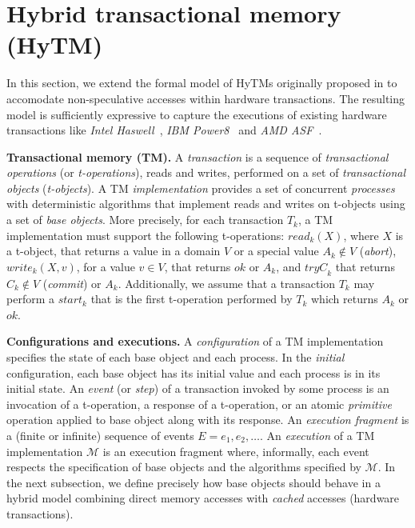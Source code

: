 \section{Hybrid transactional memory (HyTM)}
\label{sec:hytm}
%
In this section, we extend the formal model of HyTMs originally proposed in \cite{htmdisc15} to accomodate non-speculative accesses within hardware transactions.
The resulting model is sufficiently expressive to capture the executions of existing hardware transactions like \emph{Intel Haswell}~\cite{Rei12},
\emph{IBM Power8}~\cite{bluegene} and \emph{AMD ASF}~\cite{asf}.

\vspace{1mm}\noindent\textbf{Transactional memory (TM).} 
A \emph{transaction} is a sequence of \emph{transactional operations}
(or \emph{t-operations}), reads and writes, performed on a set of \emph{transactional objects} 
(\emph{t-objects}). 
A TM \emph{implementation} provides a set of
concurrent \emph{processes} with deterministic algorithms that implement reads and
writes on t-objects using  a set of \emph{base objects}.
More precisely, for each transaction $T_k$, a TM implementation must support the following t-operations: 
$\mathit{read}_k(X)$, where $X$ is a t-object, that returns a value in
a domain $V$
or a special value $A_k\notin V$ (\emph{abort}),
$\mathit{write}_k(X,v)$, for a value $v \in V$,
that returns $\mathit{ok}$ or $A_k$, and
$\mathit{tryC}_k$ that returns $C_k\notin V$ (\emph{commit}) or $A_k$.
Additionally, we assume that a transaction $T_k$
may perform a $\mathit{start_k}$ that is the first t-operation performed by $T_k$ which returns $A_k$ or $\mathit{ok}$.

\vspace{1mm}\noindent\textbf{Configurations and executions.} 
A \emph{configuration} of a TM implementation specifies the state of each base object and each process. 
In the \emph{initial} configuration, each base object has its initial value and each process is in its initial state. 
An \emph{event} (or \emph{step}) of a transaction invoked by some process is an invocation of a t-operation, 
a response of a t-operation, or an atomic \emph{primitive} operation applied to base object along with its response. 
An \emph{execution fragment} is a (finite or infinite) sequence of events $E = e_1,e_2,\dots$. 
An \emph{execution} of a TM implementation $\mathcal{M}$ is an
execution fragment where, informally, each event respects the
specification of base objects and the algorithms specified by $\mathcal{M}$.
In the next subsection, we define precisely how base objects should
behave in a hybrid model combining direct memory accesses with \emph{cached} accesses (hardware
transactions).

